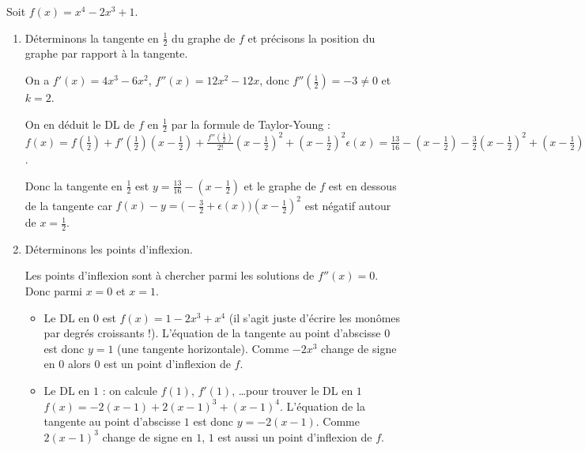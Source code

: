 \documentclass[class=report,crop=false]{standalone}
\begin{document}
\begin{exemple}
Soit $f(x)=x^4-2x^3+1$.

\begin{enumerate}
  \item Déterminons la tangente en $\frac{1}{2}$ du graphe de $f$
et précisons la position du graphe par rapport à la tangente.

On a $f'(x)=4x^3-6x^2$, $f''(x)=12x^2-12x$, donc $f''(\frac{1}{2}) = -3 \neq 0$ et $k=2$.

On en déduit le DL de $f$ en $\frac{1}{2}$ par la formule de Taylor-Young :
$f(x)=f(\frac12)+f'(\frac12)(x-\frac12)+\frac{f''(\frac12)}{2!}(x-\frac12)^2 +(x-\frac12)^2 \epsilon(x)
=\frac{13}{16} -(x- \frac12) -\frac{3}{2}(x-\frac12)^2 + (x-\frac12)^2 \epsilon(x)$.


Donc la tangente en $\frac12$ est
$y= \frac{13}{16} -(x- \frac12)$ et le graphe de $f$ est en dessous
de la tangente car $f(x)-y =  \big(-\frac32 + \epsilon(x)\big)(x-\frac12)^2$ est négatif
autour de $x=\frac12$.


  \item Déterminons les points d'inflexion.

Les points d'inflexion sont à chercher parmi les solutions de $f''(x)=0$. Donc parmi $x=0$ et $x=1$.
\begin{itemize}
\item Le DL en $0$ est $f(x)= 1-2x^3+x^4$ (il s'agit juste d'écrire les monômes par degrés croissants !).
L'équation de la tangente au point d'abscisse $0$ est donc $y=1$ (une tangente horizontale).
Comme $-2x^3$ change de signe en $0$ alors $0$ est un point d'inflexion de $f$.

\item Le DL en $1$ : on calcule $f(1)$, $f'(1)$, \ldots pour trouver le DL en $1$
$f(x)= -2(x-1) + 2(x-1)^3+(x-1)^4$.
L'équation de la tangente au point d'abscisse $1$ est donc $y=-2(x-1)$.
Comme $2(x-1)^3$ change de signe en $1$, $1$ est aussi un point d'inflexion de $f$.
\end{itemize}
\end{enumerate}


\end{exemple}
\end{document}
